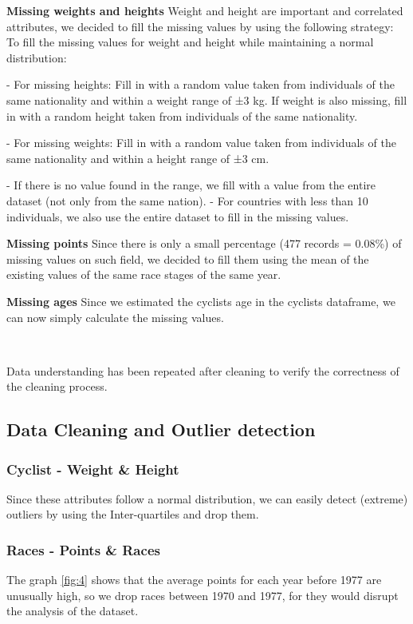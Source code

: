 \documentclass{article}
\begin{document}
\textbf{Missing weights and heights}
Weight and height are important and correlated attributes, we decided to fill the missing values by using the following strategy:
To fill the missing values for weight and height while maintaining a normal distribution:

- For missing heights: Fill in with a random value taken from individuals of the same nationality and within a weight range of ±3 kg. If weight is also missing, fill in with a random height taken from individuals of the same nationality.

- For missing weights: Fill in with a random value taken from individuals of the same nationality and within a height range of ±3 cm.

- If there is no value found in the range, we fill with a value from the entire dataset (not only from the same nation).
- For countries with less than 10 individuals, we also use the entire dataset to fill in the missing values.

\textbf{Missing points}
Since there is only a small percentage (477 records = 0.08\%) of missing values on such field, we decided to fill them using the mean of the existing values of the same race stages of the same year.

\textbf{Missing ages}
Since we estimated the cyclists age in the cyclists dataframe, we can now simply calculate the missing values.

\

Data understanding has been repeated after cleaning to verify the correctness of the cleaning process.






\subsection{Data Cleaning and Outlier detection}
\subsubsection{Cyclist - Weight & Height}
Since these attributes follow a normal distribution, we can easily detect (extreme) outliers by using the Inter-quartiles and drop them.
\subsubsection{Races - Points & Races}
The graph \ref{fig:4} shows that the average points for each year before 1977 are unusually high, so we drop races between 1970 and 1977, for they would disrupt the analysis of the dataset. 
\end{document}
